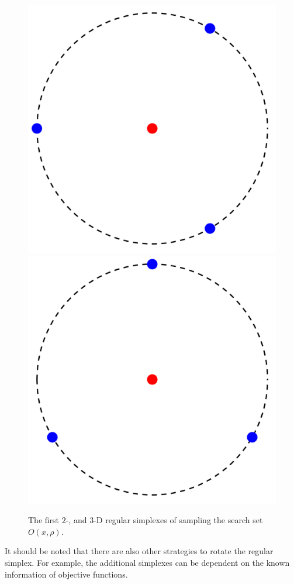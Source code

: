 \documentclass[final,1p,times]{elsarticle}
\begin{document}
\begin{figure}[!htbp]
{		  \includegraphics[scale=0.08]{../figures/2D3.png}
		  \includegraphics[scale=0.08]{../figures/2D4.png}
	  }
	\caption{The first $2$-, and $3$-D
	regular simplexes of sampling the search set $O(x, \rho)$.}
\label{fig:obset:sketch}
\end{figure}
It should be noted that there are also other strategies to rotate
the regular simplex. For example, the additional simplexes can be
dependent on the known information of objective functions. 
\end{document}

